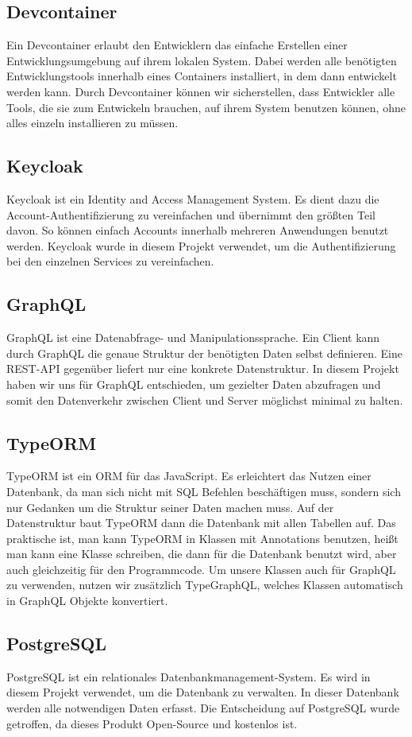 \subsection{Devcontainer}
    Ein Devcontainer erlaubt den Entwicklern das einfache Erstellen einer Entwicklungsumgebung auf ihrem lokalen System.
    Dabei werden alle benötigten Entwicklungstools innerhalb eines Containers installiert, in dem dann entwickelt werden kann.
    Durch Devcontainer können wir sicherstellen, dass Entwickler alle Tools, die sie zum Entwickeln brauchen, auf ihrem System benutzen können, ohne alles einzeln installieren zu müssen.
\subsection{Keycloak}
    Keycloak ist ein Identity and Access Management System. Es dient dazu die Account-Authentifizierung zu vereinfachen und übernimmt den größten Teil davon.
    So können einfach Accounts innerhalb mehreren Anwendungen benutzt werden. Keycloak wurde in diesem Projekt verwendet, um die Authentifizierung bei den einzelnen Services zu vereinfachen.
\subsection{GraphQL}
    GraphQL ist eine Datenabfrage- und Manipulationssprache. Ein Client kann durch GraphQL die genaue Struktur der benötigten Daten selbst definieren.
    Eine REST-API gegenüber liefert nur eine konkrete Datenstruktur.
    In diesem Projekt haben wir uns für GraphQL entschieden, um gezielter Daten abzufragen und somit den Datenverkehr zwischen Client und Server möglichst minimal zu halten.
\subsection{TypeORM}
    TypeORM ist ein \ac{ORM} für das JavaScript. Es erleichtert das Nutzen einer Datenbank, da man sich nicht mit \ac{SQL} Befehlen beschäftigen muss, sondern sich nur Gedanken um die Struktur seiner Daten machen muss.
    Auf der Datenstruktur baut TypeORM dann die Datenbank mit allen Tabellen auf. Das praktische ist, man kann TypeORM in Klassen mit Annotations benutzen, heißt man kann eine Klasse schreiben, die dann für die Datenbank benutzt wird,
    aber auch gleichzeitig für den Programmcode. Um unsere Klassen auch für GraphQL zu verwenden, nutzen wir zusätzlich TypeGraphQL, welches Klassen automatisch in GraphQL Objekte konvertiert.
\subsection{PostgreSQL}
    PostgreSQL ist ein relationales Datenbankmanagement-System. Es wird in diesem Projekt verwendet, um die Datenbank zu verwalten. In dieser Datenbank werden alle notwendigen Daten erfasst.
    Die Entscheidung auf PostgreSQL wurde getroffen, da dieses Produkt Open-Source und kostenlos ist.    
